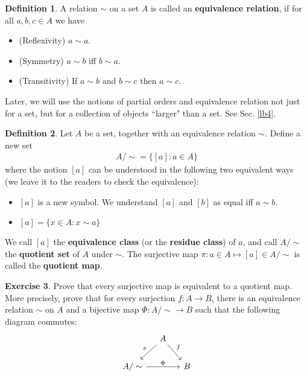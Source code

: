 \documentclass[12pt,b5paper,notitlepage]{article}
\theoremstyle{definition}
\newtheorem{df}{Definition}[section]
\newtheorem{exe}[df]{Exercise}
\theoremstyle{plain}
\numberwithin{equation}{section}
\begin{document}
\begin{df}
A relation $\sim$ on a set $A$ is called an \textbf{equivalence relation}, if for all $a,b,c\in A$ we have
\begin{itemize}
\item (Reflexivity) $a\sim a$.
\item (Symmetry) $a\sim b$ iff $b\sim a$.
\item (Transitivity) If $a\sim b$ and $b\sim c$ then $a\sim c$.
\end{itemize}
\end{df}

Later, we will use the notions of partial orders and equivalence relation not just for a set, but for a collection of objects ``larger" than a set. See Sec. \ref{lb4}.

\begin{df}
Let $A$ be a set, together with an equivalence relation $\sim$. Define a new set
\begin{align*}
{A/\sim}=\{[a]: a\in A\}
\end{align*}
where the notion $[a]$ can be understood in the following two equivalent ways (we leave it to the readers to check the equivalence):
\begin{itemize}
\item[(1)] $[a]$ is a new symbol. We understand $[a]$ and $[b]$ as equal iff $a\sim b$.
\item[(2)] $[a]=\{x\in A: x\sim a \}$
\end{itemize}
We call $[a]$ the \textbf{equivalence class} (or the \textbf{residue class}) of $a$, and call $A/\sim$ the \textbf{quotient set}  of $A$ under $\sim$. The surjective map $\pi:a\in A\mapsto [a]\in {A/\sim}$ is called the \textbf{quotient map}.
\end{df}


\begin{exe}
Prove that every surjective map  is equivalent to a quotient map. More precisely, prove that for every surjection $f:A\rightarrow B$, there is an equivalence relation $\sim$ on $A$ and a bijective map $\Phi:{A/\sim}\rightarrow B$ such that the following diagram commutes:
\begin{equation}\label{eq7}
\begin{tikzcd}[column sep=small]
                          & A \arrow[rd, "f"] \arrow[ld, "\pi"'] &   \\
{A/\sim} \arrow[rr, "\Phi"] &                                      & B
\end{tikzcd}
\end{equation}
\end{exe}
\end{document}
